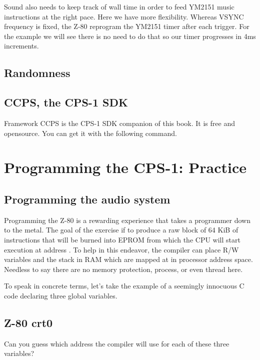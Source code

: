 Sound also needs to keep track of wall time in order to feed YM2151 music instructions at the right pace. Here we have more flexibility. Whereas VSYNC frequency is fixed,  the Z-80 reprogram the YM2151 timer after each trigger. For the example we will see there is no need to do that so our timer progresses in 4ms increments.

\section{Randomness}

\section{CCPS, the CPS-1 SDK}
Framework CCPS is the CPS-1 SDK companion of this book. It is free and opensource. You can get it with the following command.







\chapter{Programming the CPS-1: Practice}


\section{Programming the audio system}
Programming the Z-80 is a rewarding experience that takes a programmer down to the metal. The goal of the exercise if to produce a raw block of 64 KiB of instructions that will be burned into EPROM from which the CPU will start execution at address . To help in this endeavor, the compiler can place R/W variables and the stack in RAM which are mapped at  in processor address space. Needless to say there are no memory protection, process, or even thread here.




To speak in concrete terms, let's take the example of a seemingly innocuous C code declaring three global variables.

\section{Z-80 crt0}



Can you guess which address the compiler will use for each of these three variables?

